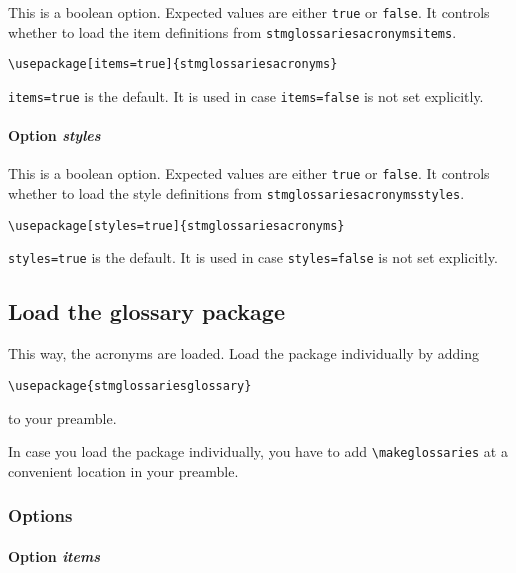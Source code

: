 \documentclass[%
  type=article,%
  layout=koma,%
  hyperref=true,%
  conditionallox=true,%
  conditionalloxnewpage=false,%
  date=true,%
  index=true,%
  listings=true%
]{stmtext}
\begin{document}
This is a boolean option. Expected values are either \texttt{true} or \texttt{false}. It controls whether to load the item definitions from \texttt{stmglossariesacronymsitems}.

\begin{verbatim}
\usepackage[items=true]{stmglossariesacronyms}
\end{verbatim}

\texttt{items=true} is the default. It is used in case \texttt{items=false} is not set explicitly.

\paragraph{Option \protect\textit{styles}}

This is a boolean option. Expected values are either \texttt{true} or \texttt{false}. It controls whether to load the style definitions from \texttt{stmglossariesacronymsstyles}.

\begin{verbatim}
\usepackage[styles=true]{stmglossariesacronyms}
\end{verbatim}

\texttt{styles=true} is the default. It is used in case \texttt{styles=false} is not set explicitly.

\subsection{Load the glossary package}
\label{sec:usage:preamble:glossary}

This way, the acronyms are loaded. Load the package individually by adding

\begin{verbatim}
\usepackage{stmglossariesglossary}
\end{verbatim}

to your preamble.

In case you load the package individually, you have to add \texttt{\textbackslash makeglossaries} at a convenient location in your preamble.

\subsubsection{Options}

\paragraph{Option \protect\textit{items}}
\end{document}
